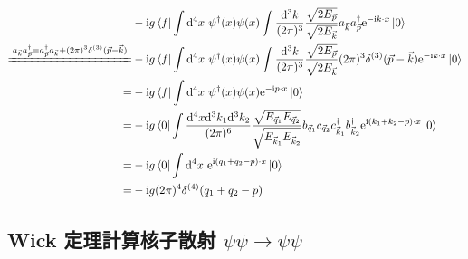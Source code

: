 \documentclass{article}
\begin{document}
$$
\begin{aligned}
& -\mathrm{i}g\left\langle f\right|\int\mathrm{d}^4x\ \psi^{\dagger}(x)\psi(x)\int\frac{\mathrm{d}^3k}{(2\pi)^3}\frac{\sqrt{2E_{\vec{p}}}}{\sqrt{2E_{\vec{k}}}}a_{\vec{k}}a_{\vec{p}}^{\dagger}\mathrm{e}^{-\mathrm{i}k\cdot x}\left|0\right\rangle                                                                     \\
\xlongequal{a_{\vec{k}}a_{\vec{p}}^{\dagger}=a_{\vec{p}}^{\dagger}a_{\vec{k}}+(2\pi)^3\delta^{(3)}(\vec{p}-\vec{k})} & -\mathrm{i}g\left\langle f\right|\int\mathrm{d}^4x\ \psi^{\dagger}(x)\psi(x)\int\frac{\mathrm{d}^3k}{(2\pi)^3}\frac{\sqrt{2E_{\vec{p}}}}{\sqrt{2E_{\vec{k}}}}(2\pi)^3\delta^{(3)}(\vec{p}-\vec{k})\mathrm{e}^{-\mathrm{i}k\cdot x}\left|0\right\rangle                                                                \\
=                                                                                                                    & -\mathrm{i}g\left\langle f\right|\int\mathrm{d}^4x\ \psi^{\dagger}(x)\psi(x)\mathrm{e}^{-\mathrm{i}p\cdot x}\left|0\right\rangle                                                                                                                                                                                      \\
=                                                                                                                    & -\mathrm{i}g\left\langle 0\right|\int\frac{\mathrm{d}^4x\mathrm{d}^3k_{1}\mathrm{d}^3k_{2}}{(2\pi)^6}\frac{\sqrt{E_{\vec{q}_1}E_{\vec{q}_2}}}{\sqrt{E_{\vec{k}_1}E_{\vec{k}_2}}}b_{\vec{q}_1}c_{\vec{q}_2}c_{\vec{k}_1}^{\dagger}b_{\vec{k}_2}^{\dagger}\mathrm{e}^{\mathrm{i}(k_1+k_2-p)\cdot x}\left|0\right\rangle \\
=                                                                                                                    & -\mathrm{i}g\left\langle 0\right|\int\mathrm{d}^4x\ \mathrm{e}^{\mathrm{i}(q_1+q_2-p)\cdot x}\left|0\right\rangle                                                                                                                                                                                                     \\
=                                                                                                                    & -\mathrm{i}g(2\pi)^4\delta^{(4)}(q_1+q_2-p)
\end{aligned}
$$

\subsection{Wick 定理計算核子散射 $\psi\psi\to\psi\psi$}
\end{document}
